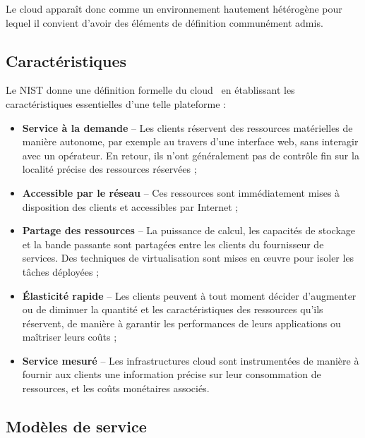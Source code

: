Le cloud apparaît donc comme un environnement hautement hétérogène pour lequel il convient d'avoir des éléments de définition communément admis.

\subsection{Caractéristiques}

Le \gls{NIST} donne une définition formelle du cloud~\cite{mellNISTDefinitionCloud} en établissant les caractéristiques essentielles d'une telle plateforme :

\begin{itemize}
    \item \textbf{Service à la demande} -- Les clients réservent des ressources matérielles de manière autonome, par exemple au travers d'une interface web, sans interagir avec un opérateur. En retour, ils n'ont généralement pas de contrôle fin sur la localité précise des ressources réservées ;
    \item \textbf{Accessible par le réseau} -- Ces ressources sont immédiatement mises à disposition des clients et accessibles par Internet ;
    \item \textbf{Partage des ressources} -- La puissance de calcul, les capacités de stockage et la bande passante sont partagées entre les clients du fournisseur de services. Des techniques de virtualisation sont mises en œuvre pour isoler les tâches déployées ;
    \item \textbf{Élasticité rapide} -- Les clients peuvent à tout moment décider d'augmenter ou de diminuer la quantité et les caractéristiques des ressources qu'ils réservent, de manière à garantir les performances de leurs applications ou maîtriser leurs coûts ;
    \item \textbf{Service mesuré} -- Les infrastructures cloud sont instrumentées de manière à fournir aux clients une information précise sur leur consommation de ressources, et les coûts monétaires associés.
\end{itemize}

\subsection{Modèles de service}

